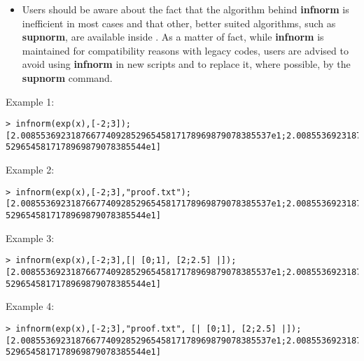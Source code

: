 \begin{itemize}
\item Users should be aware about the fact that the algorithm behind
   \textbf{infnorm} is inefficient in most cases and that other, better suited
   algorithms, such as \textbf{supnorm}, are available inside \sollya. As a
   matter of fact, while \textbf{infnorm} is maintained for compatibility reasons
   with legacy \sollya codes, users are advised to avoid using \textbf{infnorm}
   in new \sollya scripts and to replace it, where possible, by the
   \textbf{supnorm} command.
\end{itemize}
\noindent Example 1: 
\begin{center}\begin{minipage}{15cm}\begin{Verbatim}[frame=single]
> infnorm(exp(x),[-2;3]);
[2.00855369231876677409285296545817178969879078385537e1;2.0085536923187667740928
5296545817178969879078385544e1]
\end{Verbatim}
\end{minipage}\end{center}
\noindent Example 2: 
\begin{center}\begin{minipage}{15cm}\begin{Verbatim}[frame=single]
> infnorm(exp(x),[-2;3],"proof.txt");
[2.00855369231876677409285296545817178969879078385537e1;2.0085536923187667740928
5296545817178969879078385544e1]
\end{Verbatim}
\end{minipage}\end{center}
\noindent Example 3: 
\begin{center}\begin{minipage}{15cm}\begin{Verbatim}[frame=single]
> infnorm(exp(x),[-2;3],[| [0;1], [2;2.5] |]);
[2.00855369231876677409285296545817178969879078385537e1;2.0085536923187667740928
5296545817178969879078385544e1]
\end{Verbatim}
\end{minipage}\end{center}
\noindent Example 4: 
\begin{center}\begin{minipage}{15cm}\begin{Verbatim}[frame=single]
> infnorm(exp(x),[-2;3],"proof.txt", [| [0;1], [2;2.5] |]);
[2.00855369231876677409285296545817178969879078385537e1;2.0085536923187667740928
5296545817178969879078385544e1]
\end{Verbatim}
\end{minipage}\end{center}
